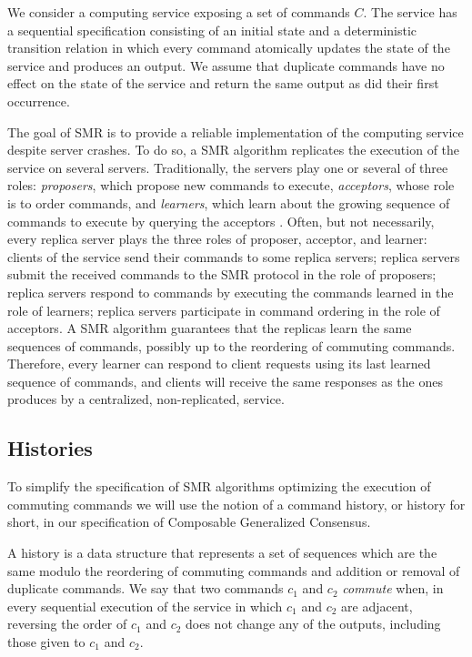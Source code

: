 \documentclass{llncs}
\begin{document}
We consider a computing service exposing a set of commands $C$. The
service has a sequential specification consisting of an initial state
and a deterministic transition relation in which every command
atomically updates the state of the service and produces an output. We
assume that duplicate commands have no effect on the state of the
service and return the same output as did their first occurrence.

The goal of SMR is to provide a reliable implementation of the computing service despite server crashes.
To do so, a SMR algorithm replicates the execution of the service on several servers. 
Traditionally, the servers play one or
several of three roles: \emph{proposers}, which propose new commands to execute,
\emph{acceptors}, whose role is to order commands, and
\emph{learners}, which learn about the growing sequence of commands to
execute by querying the acceptors \cite{lamport2001paxos}. Often, but not necessarily, every replica server plays the
three roles of proposer, acceptor, and learner: clients of the service
send their commands to some replica servers; replica servers submit
the received commands to the SMR protocol in the role of proposers;
replica servers respond to commands by executing the commands learned
in the role of learners; replica servers participate in command
ordering in the role of acceptors.  A SMR algorithm guarantees that
the replicas learn the same sequences of commands, possibly up to the
reordering of commuting commands. Therefore, every learner can respond to client
requests using its last learned sequence of commands, and clients will receive
the same responses as the ones produces by a centralized, non-replicated,
service. 

\subsection{Histories}

To simplify the specification of SMR algorithms optimizing the execution of commuting commands 
we will use the notion of a command history, or history for short, in our specification of Composable Generalized Consensus.

A history is a data structure that
represents a set of sequences which are the same modulo the reordering
of commuting commands and addition or removal of duplicate commands.
We say that two commands $c_1$ and $c_2$ \emph{commute} when, in every
sequential execution of the service in which $c_1$ and $c_2$ are adjacent,
reversing the order of $c_1$ and $c_2$ does not change any of the outputs,
including those given to $c_1$ and $c_2$.
\end{document}

